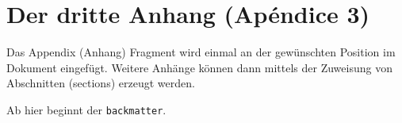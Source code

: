 \chapter{Der dritte Anhang (Ap\'endice 3)}

Das Appendix (Anhang) Fragment wird einmal an der gew\"{u}nschten Position
im Dokument eingef\"{u}gt. Weitere Anh\"{a}nge k\"{o}nnen dann mittels der
Zuweisung von Abschnitten (sections) erzeugt werden.

\bigskip

Ab hier beginnt der \verb|backmatter|.
